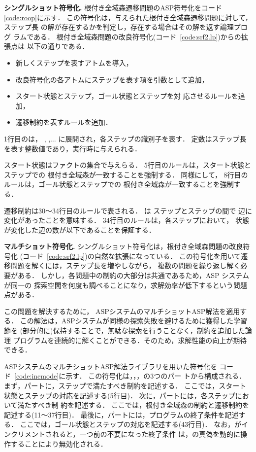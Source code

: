 \textbf{シングルショット符号化.}
根付き全域森遷移問題のASP符号化をコード\ref{code:roop}に示す．
この符号化は，与えられた根付き全域森遷移問題に対して，ステップ長
の解が存在するかを判定し，存在する場合はその解を返す論理プログ
ラムである．
根付き全域森問題の改良符号化(コード~\ref{code:srf2.lp})からの拡張点は
以下の通りである．
\begin{itemize}
\item 新しくステップを表すアトムを導入，
\item 改良符号化の各アトムにステップを表す項を引数として追加，
\item スタート状態とステップ，ゴール状態とステップを対
  応させるルールを追加，
\item 遷移制約を表すルールを追加．
\end{itemize}
1行目のは，
,
,$\dots$
に展開され，各ステップの識別子を表す．
定数はステップ長を表す整数値であり，実行時に与えられる．

スタート状態はファクトの集合で与えらる．
5行目のルールは，スタート状態とステップでの
根付き全域森が一致することを強制する．
同様にして，
8行目のルールは，ゴール状態とステップでの
根付き全域森が一致することを強制する．

遷移制約は30〜34行目のルールで表される．
は
ステップとステップの間で
辺に変化があったことを意味する．
34行目のルールは，各ステップにおいて，
状態が変化した辺の数が以下であることを保証する．

\textbf{マルチショット符号化.}
シングルショット符号化は，根付き全域森問題の改良符号化
(コード~\ref{code:srf2.lp})の自然な拡張になっている．
この符号化を用いて遷移問題を解くには，ステップ長を増やしながら，
複数の問題を繰り返し解く必要がある．
しかし，各問題中の制約の大部分は共通であるため，ASP システムが同一の
探索空間を何度も調べることになり，求解効率が低下するという問題点がある．

この問題を解決するために，
ASPシステム{\clingo}のマルチショットASP解法を適用する．
この解法は，ASPシステムが同様の探索失敗を避けるために獲得した学習節を
(部分的に)保持することで，無駄な探索を行うことなく，制約を追加した論理
プログラムを連続的に解くことができる．そのため，求解性能の向上が期待できる．

ASPシステム{\clingo}のマルチショットASP解法ライブラリを用いた符号化を
コード~\ref{code:incmode}に示す．
この符号化は，，，の3つのパー
トから構成される．
%
まず，パートに，ステップで満たすべき制約を記述する．
ここでは，スタート状態とステップの対応を記述する(5行目)．
%
次に，パートには，各ステップにおいて満たすべき制
約を記述する．
ここでは，根付き全域森の制約と遷移制約を記述する(11〜37行目)．
%
最後に，パートには，プログラムの終了条件を記述する．
ここでは，ゴール状態とステップの対応を記述する(43行目)．
なお，がインクリメントされると，一つ前の不要になった終了条件
は，の真偽を動的に操作することにより無効化される．

